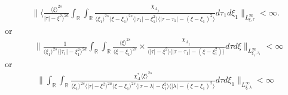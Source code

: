 \documentclass[12pt,reqno]{amsart}
\numberwithin{equation}{section}  %
\numberwithin{figure}{section}
\newcommand{\rr}{\mathbb{R}}
\theoremstyle{plain}
\theoremstyle{definition}
\theoremstyle{remark}
\begin{document}
%
%
%
%
\begin{equation}
  \label{key-sup-estimate-real}
  \begin{split}
     \| \langle  \frac{\langle \xi
     \rangle ^{2s}}{ | \tau | - \xi^{2} \rangle ^{2a}}\int_{\rr} \int_{\rr} \frac{\chi_{A_{j}}}{ \langle \xi_{1} \rangle ^{2s} \langle
\xi-\xi_{1} \rangle ^{2s}
\langle | \tau_{1}|-\xi_{1}^{2} \rangle  \langle  |\tau -
    \tau_{1} | -(\xi - \xi_{1})^{2}
    \rangle  } d \tau_1 d \xi_{1} \|_{L^\infty_{\xi, \tau}} < \infty.
  \end{split}
\end{equation}
%
or
\begin{equation}
\begin{split}
  & \| \frac{1}{\langle \xi_{1} \rangle ^{2s}
  \langle | \tau_{1} | - \xi_{1}^{2} \rangle
  ^{2a}} \int_{\rr} \int_{\rr} \frac{\langle \xi \rangle ^{2s}}{\langle
  \xi - \xi_{1}\rangle ^{2s}}  \times \frac{\chi_{A_{j}}}{\langle | \tau | - \xi^{2} \rangle  \langle | \tau -
  \tau_{1} | - (\xi - \xi_{1}^{2}) \rangle } d \tau d \xi
  \|_{L^{\infty}_{\xi_{1}, \tau_{1}}} < \infty
\end{split}
\end{equation}
or
\begin{equation}
\begin{split}
  \| \int_{\rr} \int_{\rr} \frac{\chi^{*}_{A}
    \langle \xi \rangle ^{2s}
    }{ \langle \xi_{1} \rangle^{2s} \langle | \tau | - \xi^{2}
    \rangle ^{2a}  \langle
\xi-\xi_{1} \rangle ^{2s}  \langle | \tau - \lambda|-\xi_{1}^{2}
\rangle \langle  | \lambda | -(\xi - \xi_{1})^{2}
\rangle } d \tau d \xi_{1} \|_{L^{\infty}_{\xi, \lambda}} < \infty
\end{split}
\end{equation}
\end{document}
